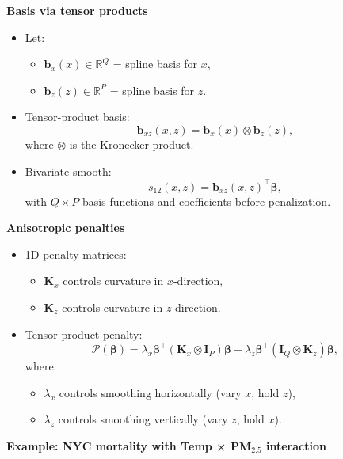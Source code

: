 \documentclass[
  letterpaper,
  DIV=11,
  numbers=noendperiod]{scrreprt}
\providecommand{\tightlist}{%
  \setlength{\itemsep}{0pt}\setlength{\parskip}{0pt}}\usepackage{longtable,booktabs,array}
\begin{document}
\textbf{Basis via tensor products}

\begin{itemize}
\tightlist
\item
  Let:

  \begin{itemize}
  \tightlist
  \item
    \(\mathbf{b}_x(x) \in \mathbb{R}^Q\) = spline basis for \(x\),
  \item
    \(\mathbf{b}_z(z) \in \mathbb{R}^P\) = spline basis for \(z\).
  \end{itemize}
\item
  Tensor-product basis: \[
  \mathbf{b}_{xz}(x,z)
  = \mathbf{b}_x(x) \otimes \mathbf{b}_z(z),
  \] where \(\otimes\) is the Kronecker product.
\item
  Bivariate smooth: \[
  s_{12}(x,z) = \mathbf{b}_{xz}(x,z)^\top \boldsymbol{\beta},
  \] with \(Q \times P\) basis functions and coefficients before
  penalization.
\end{itemize}

\textbf{Anisotropic penalties}

\begin{itemize}
\tightlist
\item
  1D penalty matrices:

  \begin{itemize}
  \tightlist
  \item
    \(\mathbf{K}_x\) controls curvature in \(x\)-direction,
  \item
    \(\mathbf{K}_z\) controls curvature in \(z\)-direction.
  \end{itemize}
\item
  Tensor-product penalty: \[
  \mathcal{P}(\boldsymbol{\beta}) =
  \lambda_x \boldsymbol{\beta}^\top (\mathbf{K}_x \otimes \mathbf{I}_P)\boldsymbol{\beta}
  + \lambda_z \boldsymbol{\beta}^\top (\mathbf{I}_Q \otimes \mathbf{K}_z)\boldsymbol{\beta},
  \] where:

  \begin{itemize}
  \tightlist
  \item
    \(\lambda_x\) controls smoothing horizontally (vary \(x\), hold
    \(z\)),
  \item
    \(\lambda_z\) controls smoothing vertically (vary \(z\), hold
    \(x\)).
  \end{itemize}
\end{itemize}

\textbf{Example: NYC mortality with Temp × PM\(_{2.5}\) interaction}
\end{document}

